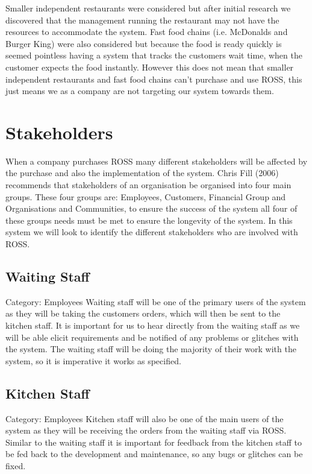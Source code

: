 \documentclass[11pt, oneside, a4paper]{report}   %
\begin{document}
\begin{flushleft}
Smaller independent restaurants were considered but after initial research we discovered that the management running the restaurant may not have the resources to accommodate the system. Fast food chains (i.e. McDonalds and Burger King) were also considered but because the food is ready quickly is seemed pointless having a system that tracks the customers wait time, when the customer expects the food instantly. However this does not mean that smaller independent restaurants and fast food chains can’t purchase and use ROSS, this just means we as a company are not targeting our system towards them. 

\newpage
\section{Stakeholders}
When a company purchases ROSS many different stakeholders will be affected by the purchase and also the implementation of the system. Chris Fill (2006) recommends that stakeholders of an organisation be organised into four main groups. These four groups are: Employees, Customers, Financial Group and Organisations and Communities, to ensure the success of the system all four of these groups needs must be met to ensure the longevity of the system. In this system we will look to identify the different stakeholders who are involved with ROSS. 
\subsection{Waiting Staff}
Category: Employees
\linebreak
Waiting staff will be one of the primary users of the system as they will be taking the customers orders, which will then be sent to the kitchen staff. It is important for us to hear directly from the waiting staff as we will be able elicit requirements and be notified of any problems or glitches with the system. The waiting staff will be doing the majority of their work with the system, so it is imperative it works as specified. 

\subsection{Kitchen Staff}
Category: Employees 
\linebreak
Kitchen staff will also be one of the main users of the system as they will be receiving the orders from the waiting staff via ROSS. Similar to the waiting staff it is important for feedback from the kitchen staff to be fed back to the development and maintenance, so any bugs or glitches can be fixed. 


\end{flushleft}
\end{document}
